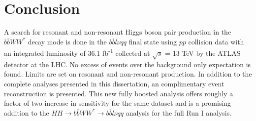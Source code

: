 \chapter{Conclusion}
\label{chap:conc}
A search for resonant and non-resonant Higgs boson pair production in the ${b\overline{b}WW^{*}}$ decay mode is done in the ${b\overline{b}l\nu qq}$ final state using $pp$ collision data with an integrated luminosity of 36.1 fb\textsuperscript{-1} collected at ${\sqrt{s}}$ = 13 TeV by the ATLAS detector at the LHC. No excess of events over the background only expectation is found. Limits are set on resonant and non-resonant production. \newline
\indent In addition to the complete analyses presented in this dissertation, an complimentary event reconstruction is presented. This new fully boosted analysis offers roughly a factor of two increase in sensitivity for the same dataset and is a promising addition to the ${HH\rightarrow b\overline{b}WW^{*}\rightarrow b\overline{b}l\nu qq}$ analysis for the full Run I analysis. 